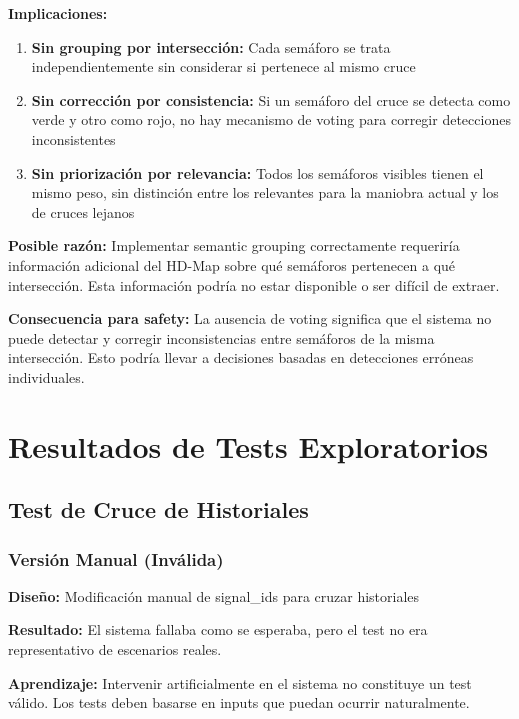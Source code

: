 \textbf{Implicaciones:}

\begin{enumerate}
    \item \textbf{Sin grouping por intersección:} Cada semáforo se trata independientemente sin considerar si pertenece al mismo cruce

    \item \textbf{Sin corrección por consistencia:} Si un semáforo del cruce se detecta como verde y otro como rojo, no hay mecanismo de voting para corregir detecciones inconsistentes

    \item \textbf{Sin priorización por relevancia:} Todos los semáforos visibles tienen el mismo peso, sin distinción entre los relevantes para la maniobra actual y los de cruces lejanos
\end{enumerate}

\textbf{Posible razón:} Implementar semantic grouping correctamente requeriría información adicional del HD-Map sobre qué semáforos pertenecen a qué intersección. Esta información podría no estar disponible o ser difícil de extraer.

\textbf{Consecuencia para safety:} La ausencia de voting significa que el sistema no puede detectar y corregir inconsistencias entre semáforos de la misma intersección. Esto podría llevar a decisiones basadas en detecciones erróneas individuales.

\section{Resultados de Tests Exploratorios}

\subsection{Test de Cruce de Historiales}

\subsubsection{Versión Manual (Inválida)}

\textbf{Diseño:} Modificación manual de signal\_ids para cruzar historiales

\textbf{Resultado:} El sistema fallaba como se esperaba, pero el test no era representativo de escenarios reales.

\textbf{Aprendizaje:} Intervenir artificialmente en el sistema no constituye un test válido. Los tests deben basarse en inputs que puedan ocurrir naturalmente.

